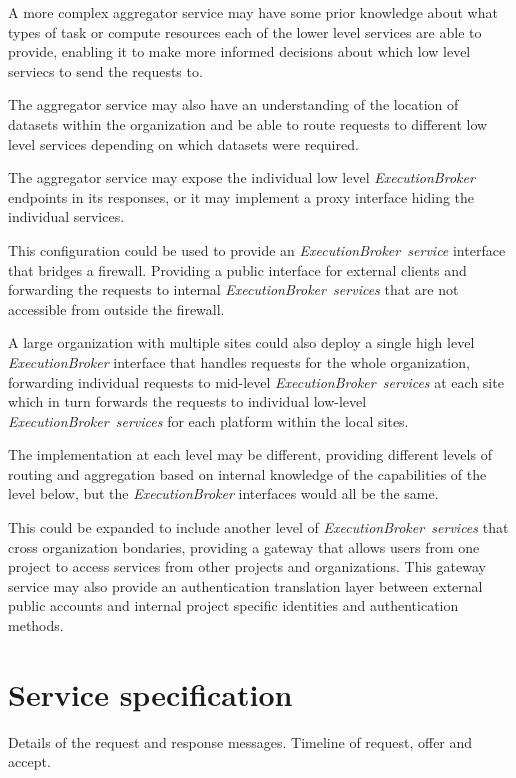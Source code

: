 \documentclass[11pt,a4paper]{ivoa}
\newcommand{\execbrokerclass} {\textit{ExecutionBroker}}
\newcommand{\execbrokerservice}[1] {\textit{ExecutionBroker~service#1}}
\newcommand{\dataset}[1] {dataset#1}
\begin{document}
A more complex aggregator service may have some prior knowledge about what types of task or compute resources
each of the lower level services are able to provide, enabling it to make more informed decisions about
which low level serviecs to send the requests to.

The aggregator service may also have an understanding of the location of \dataset{s} within the organization and
be able to route requests to different low level services depending on which \dataset{s} were required.

The aggregator service may expose the individual low level \execbrokerclass{} endpoints in its responses,
or it may implement a proxy interface hiding the individual services.

This configuration could be used to provide an \execbrokerservice{} interface
that bridges a firewall. Providing a public interface for external clients and forwarding the requests
to internal \execbrokerservice{s} that are not accessible from outside the
firewall.

A large organization with multiple sites could also deploy a single high level \execbrokerclass{}
interface that handles requests for the whole organization, forwarding individual requests to mid-level
\execbrokerservice{s} at each site which in turn forwards the requests to
individual low-level \execbrokerservice{s} for each platform within the local sites.

The implementation at each level may be different, providing different levels of routing
and aggregation based on internal knowledge of the capabilities of the level below,
but the \execbrokerclass{} interfaces would all be the same.

This could be expanded to include another level of \execbrokerservice{s} that
cross organization bondaries, providing a gateway that allows users from one project to access services
from other projects and organizations. This gateway service may also provide an authentication translation
layer between external public accounts and internal project specific identities and authentication methods.

\pagebreak

\section{Service specification}
\label{sect-service-specification}

Details of the request and response messages.
Timeline of request, offer and accept.
\end{document}
